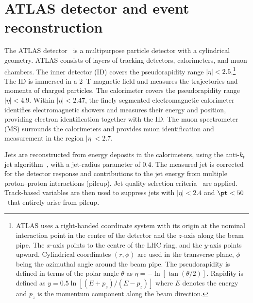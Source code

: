 \documentclass[cernpreprint,txfonts,UKenglish,texlive=2016]{\ATLASLATEXPATH atlasdoc}
\begin{document}
\section{ATLAS detector and event reconstruction}
\label{sec:methods-detector}
The ATLAS detector~\cite{PERF-2007-01,ATLAS-TDR-19} is a multipurpose particle detector with a
cylindrical geometry. 
ATLAS consists of
layers of tracking detectors, calorimeters, and muon chambers. 
The inner detector (ID) 
covers the
pseudorapidity range $|\eta| < 2.5$.\footnote{ATLAS uses a right-handed coordinate
  system with its origin at the nominal interaction point in the
  centre of the detector and the $z$-axis along the beam pipe. The
  $x$-axis points to the centre of the LHC ring, and the $y$-axis
  points upward. Cylindrical coordinates $(r,\phi)$ are used in the
  transverse plane, $\phi$ being the azimuthal angle around the beam
  pipe. The pseudorapidity is defined in terms of the polar angle
  $\theta$ as $\eta=-\ln[\tan(\theta/2)]$. Rapidity is defined as 
  $y=0.5 \ln[(E+p_z)/(E-p_z)]$ where $E$ denotes the energy and $p_z$ 
  is the momentum component along the beam direction.} 
The ID is immersed in a 2~T magnetic field and measures the
trajectories and momenta of charged particles.
The calorimeter covers the
pseudorapidity range $|\eta| < 4.9$.
 Within $|\eta| <2.47$, the finely segmented electromagnetic calorimeter identifies electromagnetic showers and measures
their energy and position, providing electron identification together with the ID. 
The muon spectrometer (MS) surrounds the calorimeters and provides muon identification and
measurement in the region $|\eta| < 2.7$.

Jets are reconstructed from energy deposits in the calorimeters, 
using the anti-$k_t$ jet algorithm~\cite{Cacciari:2008gp,Cacciari:2011ma},
with a jet-radius parameter of 0.4. The measured jet \pt{} is corrected
for the detector response and contributions to the jet energy from multiple 
proton--proton interactions (pileup). 
Jet quality selection criteria~\cite{ATLAS-CONF-2015-029} are applied.
Track-based variables are then used to suppress
jets with $|\eta|<2.4$ and $\pt < 50$\,\GeV\ that entirely arise from pileup.
\end{document}
